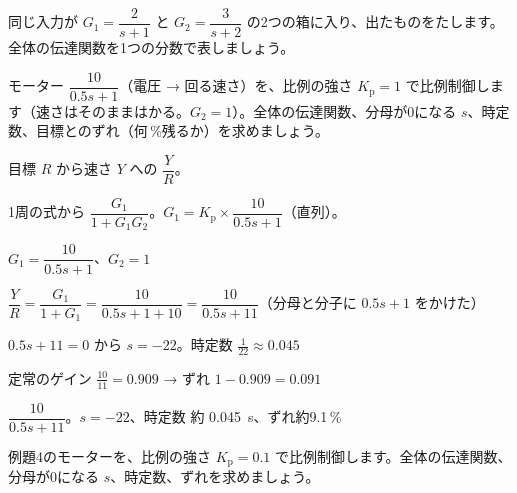 \begin{jibun}
同じ入力が $G_1=\dfrac{2}{s+1}$ と $G_2=\dfrac{3}{s+2}$ の2つの箱に入り、出たものをたします。全体の伝達関数を1つの分数で表しましょう。
\end{jibun}

\begin{reidai}[モーターの比例制御]
モーター $\dfrac{10}{0.5s+1}$（電圧 → 回る速さ）を、比例の強さ $K_{\mathrm p}=1$ で比例制御します（速さはそのままはかる。$G_2=1$）。全体の伝達関数、分母が0になる $s$、時定数、目標とのずれ（何\,\%残るか）を求めましょう。\par
\kangaekata {}\par
{}\enspace 目標 $R$ から速さ $Y$ への $\dfrac{Y}{R}$。\par
{}\enspace 1周の式から $\dfrac{G_1}{1+G_1G_2}$。$G_1=K_{\mathrm p}\times\dfrac{10}{0.5s+1}$（直列）。\par
\shiki\kixis{}\zw{} $G_1=\dfrac{10}{0.5s+1}$、$G_2=1$\par
\kixia $\dfrac{Y}{R}=\dfrac{G_1}{1+G_1}=\dfrac{10}{0.5s+1+10}=\dfrac{10}{0.5s+11}$\quad （分母と分子に $0.5s+1$ をかけた）\par
\kixia $0.5s+11=0$ から $s=-22$。時定数 $\frac{1}{22}\approx0.045$\par
\kixia 定常のゲイン $\frac{10}{11}=0.909$ → ずれ $1-0.909=0.091$\par
\kotae $\dfrac{10}{0.5s+11}$。$s=-22$、時定数 約 \qty{0.045}{s}、ずれ約9.1\,\%
\end{reidai}

\begin{jibun}
例題4のモーターを、比例の強さ $K_{\mathrm p}=0.1$ で比例制御します。全体の伝達関数、分母が0になる $s$、時定数、ずれを求めましょう。
\end{jibun}

